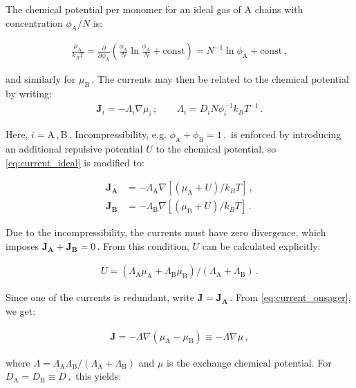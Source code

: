 \documentclass[bachelor,       %
               twoside,        %
               BCOR10mm,       %
                ngerman,english  %
               ]{GAUBM}
\begin{document}
The chemical potential per monomer for an ideal gas of A chains with concentration $\phi_\mathrm A/N$ is:

\begin{align}
  \frac{\mu_\mathrm A}{k_BT}=\frac{\partial}{\partial\phi_\mathrm A}\left(\frac{\phi_\mathrm A}{N}\ln\frac{\phi_\mathrm A}{N}+\mathrm{const}\right)=N^{-1}\ln\phi_\mathrm A +\mathrm{const}\,,
\end{align}

and similarly for $\mu_\mathrm B\,.$ The currents may then be related to the chemical potential by writing:
\begin{align}
  \mathbf{J}_i=-\Lambda_i\nabla\mu_i\,; \qquad \Lambda_i=D_iN\phi_i^{-1}k_BT^{-1}\,.
  \label{eq:current_ideal}
\end{align}

Here, $i=\mathrm A\,,\mathrm B\,.$ Incompressibility, e.g. $\phi_\mathrm A+\phi_\mathrm B=1\,,$ is enforced by introducing an additional repulsive potential $U$ to the chemical potential, so \eqref{eq:current_ideal} is modified to:

\begin{subequations}
  \begin{align}
    \mathbf{J_A}&=-\Lambda_\mathrm A\nabla [(\mu_\mathrm A + U)/k_BT]\,,\\
    \mathbf{J_B}&=-\Lambda_\mathrm B\nabla [(\mu_\mathrm B + U)/k_BT]\,.
  \end{align}
  \label{eq:current_onsager}
\end{subequations}

Due to the incompressibility, the currents must have zero divergence, which imposes $\mathbf{J_A}+\mathbf{J_B}=0\,.$ From this condition, $U$ can be calculated explicitly:

\begin{align}
  U=(\Lambda_\mathrm A\mu_\mathrm A+\Lambda_\mathrm B\mu_\mathrm B)/(\Lambda_\mathrm A+\Lambda_\mathrm B)\,.
\end{align}

Since one of the currents is redundant, write $\mathbf{J}=\mathbf{J_A}\,.$ From \eqref{eq:current_onsager}, we get:

\begin{align}
  \mathbf J=-\Lambda\nabla(\mu_\mathrm A - \mu_\mathrm B)\equiv -\Lambda\nabla\mu\,,
\end{align}

where $\Lambda=\Lambda_\mathrm A\Lambda_\mathrm B/(\Lambda_\mathrm A+\Lambda_\mathrm B)$ and $\mu$ is the exchange chemical potential. For $D_\mathrm A=D_\mathrm B\equiv D\,,$ this yields:
\end{document}

